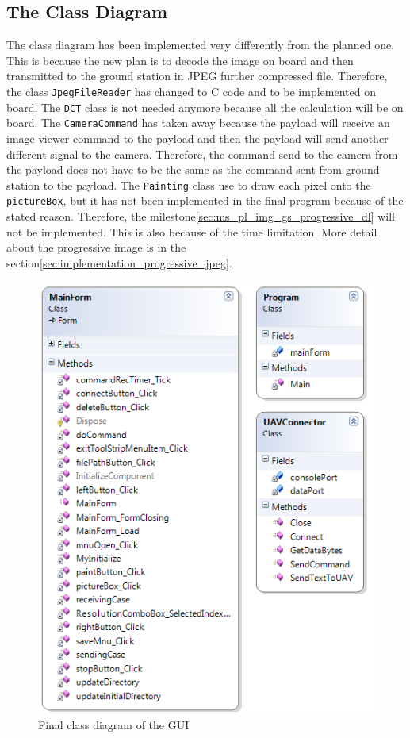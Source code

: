 \subsection*{The Class Diagram}
The class diagram has been implemented very differently from the planned one.
This is because the new plan is to decode the image on board and then transmitted to the ground station in JPEG further compressed file. 
Therefore, the class \texttt{JpegFileReader} has changed to C code and to be implemented on board. 
The \texttt{DCT} class is not needed anymore because all the calculation will be on board. 
The \texttt{CameraCommand} has taken away because the payload will receive an image viewer command to the payload and then the payload will send another different signal to the camera.
Therefore, the command send to the camera from the payload does not have to be the same as the command sent from ground station to the payload. 
The \texttt{Painting} class use to draw each pixel onto the \texttt{pictureBox}, but it has not been implemented in the final program because of the stated reason.
Therefore, the milestone\ref{sec:ms_pl_img_gs_progressive_dl} will not be implemented.
This is also because of the time limitation.
More detail about the progressive image is in the section\ref{sec:implementation_progressive_jpeg}.
 
\begin{figure}[!hbtp]
\begin{center}
\includegraphics[scale=0.7]{figures/finalClassDiagram.png} 
\end{center}
\caption{Final class diagram of the GUI\label{GUI_finalClassDiagram}}
\end{figure}

